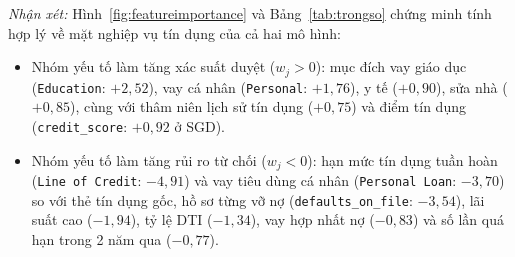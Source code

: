 \documentclass[12pt,a4paper,oneside]{report}
\begin{document}
\begin{table}[H]
  \caption{Các đặc trưng có trọng số tác động lớn nhất trong mô hình Logistic Regression và SGDClassifier.}
  \label{tab:trongso}
\end{table}

\textit{Nhận xét:} Hình~\ref{fig:featureimportance} và Bảng~\ref{tab:trongso} chứng minh tính hợp lý về mặt nghiệp vụ tín dụng của cả hai mô hình:
\begin{itemize}
  \item Nhóm yếu tố làm tăng xác suất duyệt ($w_j > 0$): mục đích vay giáo dục (\texttt{Education}: $+2{,}52$), vay cá nhân (\texttt{Personal}: $+1{,}76$), y tế ($+0{,}90$), sửa nhà ($+0{,}85$), cùng với thâm niên lịch sử tín dụng ($+0{,}75$) và điểm tín dụng (\texttt{credit\_score}: $+0{,}92$ ở SGD).
  \item Nhóm yếu tố làm tăng rủi ro từ chối ($w_j < 0$): hạn mức tín dụng tuần hoàn (\texttt{Line of Credit}: $-4{,}91$) và vay tiêu dùng cá nhân (\texttt{Personal Loan}: $-3{,}70$) so với thẻ tín dụng gốc, hồ sơ từng vỡ nợ (\texttt{defaults\_on\_file}: $-3{,}54$), lãi suất cao ($-1{,}94$), tỷ lệ DTI ($-1{,}34$), vay hợp nhất nợ ($-0{,}83$) và số lần quá hạn trong 2 năm qua ($-0{,}77$).
\end{itemize}
\end{document}
